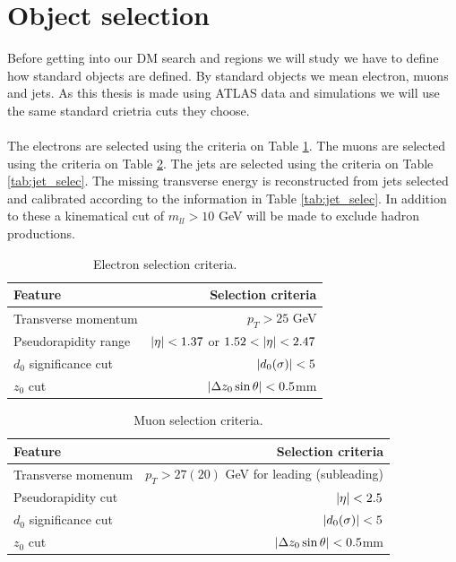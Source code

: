 \documentclass[12pt, a4paper]{book}
\begin{document}
\section{Object selection}\label{sec:obj_sel}
Before getting into our DM search and regions we will study we have to define how standard objects are defined. By standard objects we mean electron, muons and jets. As this thesis is made using ATLAS data and simulations we will use the same standard crietria 
cuts they choose.\\
\\The electrons are selected using the criteria on Table \ref{tab:E_selec}. The muons are selected using the criteria on Table \ref{tab:mu_selec}. The jets are selected using the criteria on Table \ref{tab:jet_selec}. The missing transverse energy is reconstructed from jets selected and calibrated according to the information in Table \ref{tab:jet_selec}. In addition to these a kinematical cut of $m_{ll}>10$ GeV will be made to exclude hadron productions.
\begin{table}[!h]
    \centering\caption[Electron selection criteria]{Electron selection criteria.}
    \begin{tabular}{l|r}\midrule\midrule
        Feature                                                                 & Selection criteria        \\\midrule
        Transverse momentum                                                     & $p_T > 25$ GeV     \\
        Pseudorapidity range                                                    & $\abs{\eta}<1.37$ or  $1.52<\abs{\eta}<2.47$ \\
        $d_0$ significance cut                                                  & $\abs{d_0(\sigma)}<5$    \\
        $z_0$ cut                                                               & $\abs{\Delta z_0\sin\theta}<0.5$mm    \\\midrule\midrule
    \end{tabular}
    \label{tab:E_selec}
\end{table}
\begin{table}[!h]
    \centering\caption[Muon selection criteria]{Muon selection criteria.}
    \begin{tabular}{l|r}\midrule\midrule
        Feature                                                                 & Selection criteria        \\\midrule
        Transverse momenum                                                      & $p_T > 27(20)$ GeV for leading (subleading)     \\
        Pseudorapidity cut                                                      & $\abs{\eta}<2.5$ \\
        $d_0$ significance cut                                                  & $\abs{d_0(\sigma)}<5$    \\
        $z_0$ cut                                                               & $\abs{\Delta z_0\sin\theta}<0.5$mm    \\\midrule\midrule
    \end{tabular}
    \label{tab:mu_selec}
\end{table}
\end{document}
